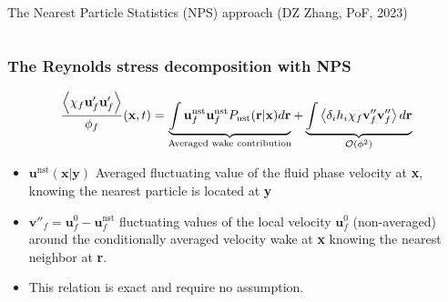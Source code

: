 \documentclass{sintefbeamer}
\begin{document}
\begin{frame}{The Nearest Particle Statistics (NPS) approach (DZ Zhang, PoF, 2023)}
\begin{columns}
\end{columns}

\end{frame}


\begin{frame}
  \frametitle{The Reynolds stress decomposition with NPS}
  \begin{equation*}
    \frac{\left<\chi_f \textbf{u}'_f\textbf{u}'_f\right>}{\phi_f}(\textbf{x},t)
    = 
    \underbrace{\int 
      \textbf{u}^\text{nst}_f
      \textbf{u}^\text{nst}_f 
      P_\text{nst}(\textbf{r}|\textbf{x}) d\textbf{r} 
    }_\text{Averaged wake contribution}
    + \underbrace{ 
      \int \left<\delta_i h_i \chi_f \textbf{v}_f''\textbf{v}_f''\right>  d\textbf{r}
    }_{\mathcal{O}(\phi^2)}
  \end{equation*}

\begin{itemize}
  \item $\textbf{u}^\text{nst}(\textbf{x}|\textbf{y})$ Averaged fluctuating value of the fluid phase velocity at \textbf{x}, knowing the nearest particle is located at \textbf{y}
  \item $\textbf{v}''_f = \textbf{u}^0_f - \textbf{u}^\text{nst}_f$ fluctuating values of the local velocity $\textbf{u}_f^0$ (non-averaged) around the conditionally averaged velocity wake at \textbf{x} knowing the nearest neighbor at \textbf{r}.
  \item This relation is exact and require no assumption. 
\end{itemize}
\end{frame}
\end{document}
